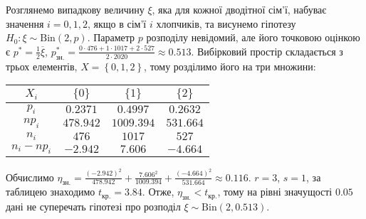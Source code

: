 \begin{example}
\begin{enumerate}
            Розглянемо випадкову величину $\xi$, яка для кожної дводітної сім'ї, набуває значення $i = 0, 1, 2$, якщо в сім'ї $i$ хлопчиків,
            та висунемо гіпотезу $H_0: \xi \sim \mathrm{Bin}(2, p)$. Параметр $p$ розподілу невідомий, але його точковою оцінкою є
            $p^* = \frac{1}{2} \overline{\xi}$, $p^*_{\text{зн.}} = \frac{0\cdot 476 + 1\cdot 1017 + 2\cdot 527}{2\cdot 2020} \approx 0.513$.
            Вибірковий простір складається з трьох елементів, $X = \left\{0, 1, 2 \right\}$, тому розділимо його на три множини:
            \begin{center}
                \begin{tabular}{|c|c|c|c|}
                    \hline
                    $X_i$ & $\{0\}$ & $\{1\}$ & $\{2\}$ \\
                    \hline
                    $p_i$ & $0.2371$ & $0.4997$ & $0.2632$ \\
                    \hline
                    $n p_i$ & $478.942$ & $1009.394$ & $531.664$ \\
                    \hline
                    $n_i$ & $476$ & $1017$ & $527$ \\
                    \hline
                    $n_i - np_i$ & $-2.942$ & $7.606$ & $-4.664$ \\
                    \hline
                \end{tabular}
            \end{center}
            Обчислимо $\eta_{\text{зн.}} = \frac{(-2.942)^2}{478.942} + \frac{7.606^2}{1009.394} + \frac{(-4.664)^2}{531.664} \approx 0.116$.
            $r = 3$, $s=1$, за таблицею знаходимо $t_{\text{кр.}} = 3.84$.
            Отже, $\eta_{\text{зн.}} < t_{\text{кр.}}$, тому на рівні значущості $0.05$ дані не суперечать гіпотезі про розподіл $\xi \sim \mathrm{Bin}(2, 0.513)$.
    \end{enumerate}
\end{example}

